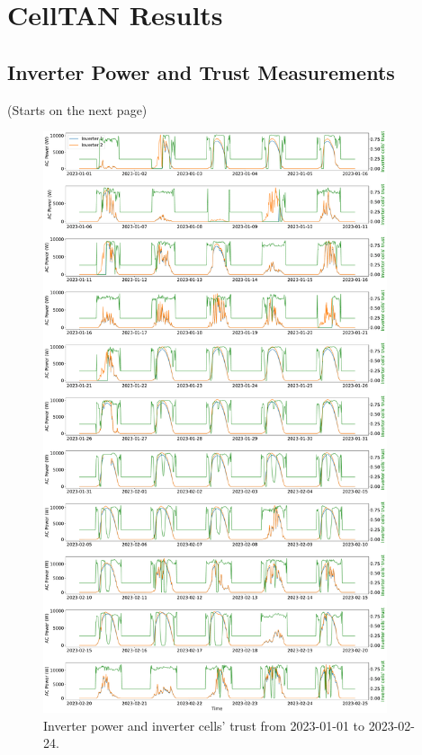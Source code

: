 \chapter{CellTAN Results}

\section{Inverter Power and Trust Measurements} \label{ap3:alltimeseries}

(Starts on the next page)

\begin{figure}[hbtp]
    \centering
    \includegraphics[width=0.9\textwidth]{figures/appendix/c_results/all_power_and_trust_pt1.pdf}
    \caption{Inverter power and inverter cells' trust from 2023-01-01 to 2023-02-24.}
    \label{fig:alltimeseries_pt1}
\end{figure}

